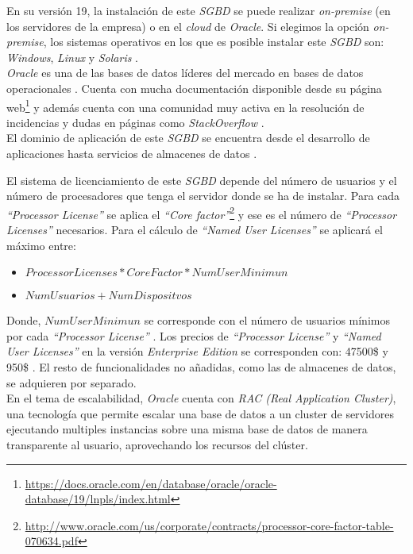 \documentclass[10pt]{article}
\begin{document}
En su versión 19, la instalación de este \emph{SGBD} se puede realizar \emph{on-premise} (en los servidores de la empresa) o en el \emph{cloud} de \emph{Oracle}. Si elegimos la opción \emph{on-premise}, los sistemas operativos en los que es posible instalar este \emph{SGBD} son: \emph{Windows}, \emph{Linux} y \emph{Solaris} \cite{ORA:1}.\\

\emph{Oracle} es una de las bases de datos líderes del mercado en bases de datos operacionales \cite{GART:1}. Cuenta con mucha documentación disponible desde su página web\footnote{\url{https://docs.oracle.com/en/database/oracle/oracle-database/19/lnpls/index.html}} y además cuenta con una comunidad muy activa en la resolución de incidencias y dudas en páginas como \emph{StackOverflow} \cite{STO:1}.\\

El dominio de aplicación de este \emph{SGBD} se encuentra desde el desarrollo de aplicaciones hasta servicios de almacenes de datos \cite{ORA:2}.

El sistema de licenciamiento de este \emph{SGBD} depende del número de usuarios y el número de procesadores que tenga el servidor donde se ha de instalar. Para cada \emph{``Processor License''} se aplica el \emph{``Core factor''}\footnote{\url{http://www.oracle.com/us/corporate/contracts/processor-core-factor-table-070634.pdf}} y ese es el número de \emph{``Processor Licenses''} necesarios. Para el cálculo de \emph{``Named User Licenses''} se aplicará el máximo entre:

\begin{itemize}
\item $ProcessorLicenses * CoreFactor * NumUserMinimun$
\item $NumUsuarios + NumDispositvos$
\end{itemize}

Donde, $NumUserMinimun$ se corresponde con el número de usuarios mínimos por cada \emph{``Processor License''} \cite{ORA:3}. Los precios de \emph{``Processor License''} y \emph{``Named User Licenses''} en la versión \emph{Enterprise Edition} se corresponden con: 47500\$ y 950\$ \cite{ORA:4}. El resto de funcionalidades no añadidas, como las de almacenes de datos, se adquieren por separado. \\

En el tema de escalabilidad, \emph{Oracle} cuenta con \emph{RAC (Real Application Cluster)}, una tecnología que permite escalar una base de datos a un cluster de servidores ejecutando multiples instancias sobre una misma base de datos de manera transparente al usuario, aprovechando los recursos del clúster. \cite{ORA:5} \\
\end{document}

